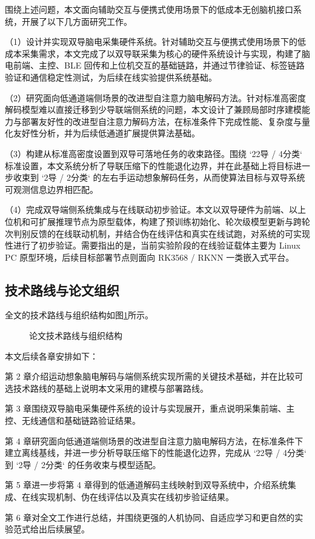 围绕上述问题，本文面向辅助交互与便携式使用场景下的低成本无创脑机接口系统，开展了以下几方面研究工作。

（1）设计并实现双导脑电采集硬件系统。针对辅助交互与便携式使用场景下的低成本采集需求，本文完成了以双导联采集为核心的硬件系统设计与实现，构建了脑电前端、主控、BLE 回传和上位机交互的基础链路，并通过节律验证、标签链路验证和通信稳定性测试，为后续在线实验提供系统基础。

（2）研究面向低通道端侧场景的改进型自注意力脑电解码方法。针对标准高密度解码模型难以直接迁移到少导联端侧系统的问题，本文设计了兼顾局部时序建模能力与部署友好性的改进型自注意力解码方法，在标准条件下完成性能、复杂度与量化友好性分析，并为后续低通道扩展提供算法基础。

（3）构建从标准高密度设置到双导可落地任务的收束路径。围绕 `22导 / 4分类` 标准设置，本文系统分析了导联压缩下的性能退化边界，并在此基础上将目标进一步收束到 `2导 / 2分类` 的左右手运动想象解码任务，从而使算法目标与双导系统可观测信息边界相匹配。

（4）完成双导端侧系统集成与在线联动初步验证。本文以双导硬件为前端、以上位机和可扩展推理节点为原型载体，构建了预训练初始化、轮次级模型更新与跨轮次判别反馈的在线联动机制，并结合伪在线评估和真实在线试跑，对系统的可实现性进行了初步验证。需要指出的是，当前实验阶段的在线验证载体主要为 Linux PC 原型环境，后续目标部署节点则面向 RK3568 / RKNN 一类嵌入式平台。

\subsection{技术路线与论文组织}

全文的技术路线与组织结构如图\ref{fig:org}所示。
\begin{figure}[htbp]
  \centering
  \caption{论文技术路线与组织结构}
  \label{fig:org}
\end{figure}

本文后续各章安排如下：

第 2 章介绍运动想象脑电解码与端侧系统实现所需的关键技术基础，并在比较可选技术路线的基础上说明本文采用的建模与部署路线。

第 3 章围绕双导脑电采集硬件系统的设计与实现展开，重点说明采集前端、主控、无线通信和基础链路验证结果。

第 4 章研究面向低通道端侧场景的改进型自注意力脑电解码方法，在标准条件下建立离线基线，并进一步分析导联压缩下的性能退化边界，完成从 `22导 / 4分类` 到 `2导 / 2分类` 的任务收束与模型适配。

第 5 章进一步将第 4 章得到的低通道解码主线映射到双导系统中，介绍系统集成、在线实现机制、伪在线评估以及真实在线初步验证结果。

第 6 章对全文工作进行总结，并围绕更强的人机协同、自适应学习和更自然的实验范式给出后续展望。
